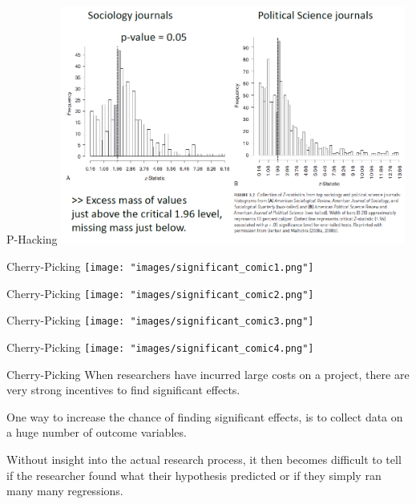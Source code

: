 \documentclass[
  ignorenonframetext,
]{beamer}
\begin{document}
\begin{frame}{P-Hacking}
\protect\hypertarget{p-hacking-2}{}
\includegraphics[width=0.85\textwidth,height=\textheight]{"images/pvalpolsci.png"}
\end{frame}

\begin{frame}{Cherry-Picking}
\protect\hypertarget{cherry-picking}{}
\texttt{[image: "images/significant\_comic1.png"]}
\end{frame}

\begin{frame}{Cherry-Picking}
\protect\hypertarget{cherry-picking-1}{}
\texttt{[image: "images/significant\_comic2.png"]}
\end{frame}

\begin{frame}{Cherry-Picking}
\protect\hypertarget{cherry-picking-2}{}
\texttt{[image: "images/significant\_comic3.png"]}
\end{frame}

\begin{frame}{Cherry-Picking}
\protect\hypertarget{cherry-picking-3}{}
\texttt{[image: "images/significant\_comic4.png"]}
\end{frame}

\begin{frame}{Cherry-Picking}
\protect\hypertarget{cherry-picking-4}{}
When researchers have incurred large costs on a project, there are very
strong incentives to find significant effects.

One way to increase the chance of finding significant effects, is to
collect data on a huge number of outcome variables.

Without insight into the actual research process, it then becomes
difficult to tell if the researcher found what their hypothesis
predicted or if they simply ran many many regressions.
\end{frame}
\end{document}
